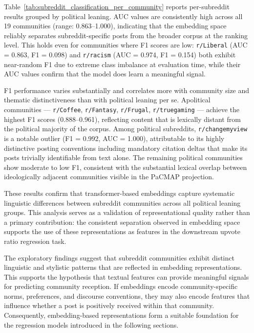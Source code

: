 Table~\ref{tab:subreddit_classification_per_community} reports per-subreddit results grouped by political leaning. AUC values are consistently high across all 19 communities (range: 0.863--1.000), indicating that the embedding space reliably separates subreddit-specific posts from the broader corpus at the ranking level. This holds even for communities where F1 scores are low: \verb!r/Liberal! (AUC = 0.863, F1 = 0.098) and \verb!r/racism! (AUC = 0.974, F1 = 0.154) both exhibit near-random F1 due to extreme class imbalance at evaluation time, while their AUC values confirm that the model does learn a meaningful signal.

F1 performance varies substantially and correlates more with community size and thematic distinctiveness than with political leaning per se. Apolitical communities — \verb!r/Coffee!, \verb!r/Fantasy!, \verb!r/Frugal!, \verb!r/truegaming! — achieve the highest F1 scores (0.888--0.961), reflecting content that is lexically distant from the political majority of the corpus. Among political subreddits, \verb!r/changemyview! is a notable outlier (F1 = 0.992, AUC = 1.000), attributable to its highly distinctive posting conventions including mandatory citation deltas that make its posts trivially identifiable from text alone. The remaining political communities show moderate to low F1, consistent with the substantial lexical overlap between ideologically adjacent communities visible in the PaCMAP projection.

These results confirm that transformer-based embeddings capture systematic linguistic differences between subreddit communities across all political leaning groups. This analysis serves as a validation of representational quality rather than a primary contribution: the consistent separation observed in embedding space supports the use of these representations as features in the downstream upvote ratio regression task.

The exploratory findings suggest that subreddit communities exhibit distinct linguistic and stylistic patterns that are reflected in embedding representations. This supports the hypothesis that textual features can provide meaningful signals for predicting community reception. If embeddings encode community-specific norms, preferences, and discourse conventions, they may also encode features that influence whether a post is positively received within that community. Consequently, embedding-based representations form a suitable foundation for the regression models introduced in the following sections.

